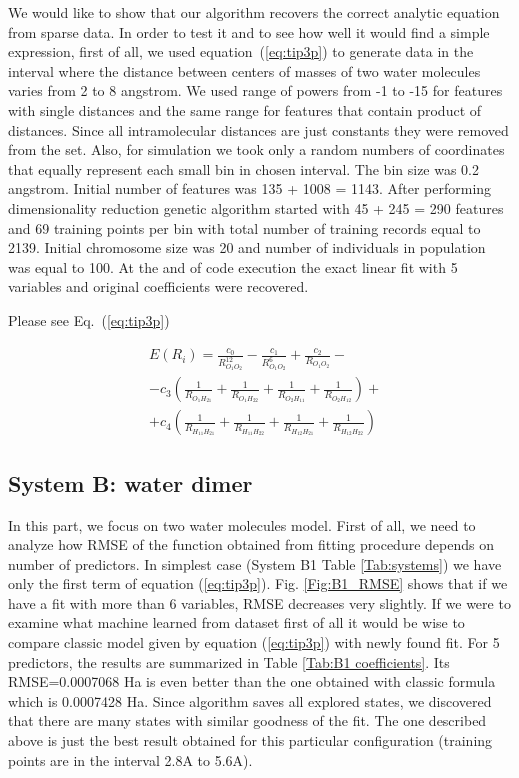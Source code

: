 \documentclass[aps,prl,reprint,amsmath,amssymb,nature]{revtex4-1}
\begin{document}
We would like to show that our algorithm recovers the correct analytic equation from sparse data. In order to test it and to see how well it would find a simple expression, first of all, we used equation~(\ref{eq:tip3p}) to generate data in the interval where the distance between centers of masses of two water molecules varies from 2 to 8 angstrom. We used range of powers from -1 to -15 for features with single distances and the same range for features that contain product of distances. Since all intramolecular distances are just constants they were removed from the set. Also, for simulation we took only a random numbers of coordinates that equally represent each small bin in chosen interval. The bin size was 0.2 angstrom. Initial number of features was 135 + 1008 = 1143. After performing dimensionality reduction genetic algorithm started with 45 + 245 = 290 features and 69 training points per bin with total number of training records equal to  2139. Initial chromosome size was 20 and number of individuals in population was equal to 100. At the and of code execution the exact linear fit with 5 variables and original coefficients were recovered.

Please see Eq.~(\ref{eq:tip3p})

\begin{eqnarray} \label{eq:tip3p}
&E(R_i) = \frac{c_0}{R_{O_1O_2}^{12}}-\frac{c_1}{R_{O_1O_2}^6} + \frac{c_2}{R_{O_1O_2}} - \nonumber
\\
& - c_3(\frac{1}{R_{O_1H_{21}}}+\frac{1}{R_{O_1H_{22}}}+\frac{1}{R_{O_2H_{11}}}+\frac{1}{R_{O_2H_{12}}}) + \nonumber
\\
& + c_4(\frac{1}{R_{H_{11}H_{21}}}+\frac{1}{R_{H_{11}H_{22}}}+\frac{1}{R_{H_{12}H_{21}}}+\frac{1}{R_{H_{12}H_{22}}})
\end{eqnarray}

\subsection{System B: water dimer}

In this part, we focus on two water molecules model. First of all, we need to analyze how RMSE of the function obtained from fitting procedure depends on number of predictors. In simplest case (System B1 Table \ref{Tab:systems}) we have only the first term of equation (\ref{eq:tip3p}). Fig. \ref{Fig:B1_RMSE} shows that if we have a fit with more than 6 variables, RMSE decreases very slightly. If we were to examine what machine learned from dataset first of all it would be wise to compare classic model given by equation (\ref{eq:tip3p}) with newly found fit. For 5 predictors, the results are summarized in Table \ref{Tab:B1 coefficients}. Its RMSE=0.0007068 Ha is even better than the one obtained with classic formula which is 0.0007428 Ha. Since algorithm saves all explored states, we discovered that there are many states with similar goodness of the fit. The one described above is just the best result obtained for this particular configuration (training points are in the interval 2.8A to 5.6A).
\end{document}

